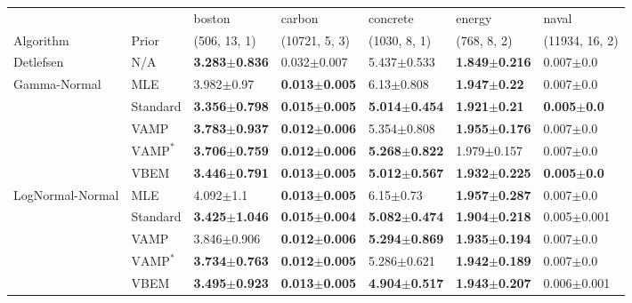 \begin{tabular}{lllllll}
\toprule
                 &      &                    boston &                    carbon &                  concrete &                    energy &                   naval \\
Algorithm & Prior& (506, 13, 1)& (10721, 5, 3)& (1030, 8, 1)& (768, 8, 2)& (11934, 16, 2)\\
\midrule
Detlefsen & N/A &  \textbf{3.283$\pm$0.836} &           0.032$\pm$0.007 &           5.437$\pm$0.533 &  \textbf{1.849$\pm$0.216} &           0.007$\pm$0.0 \\
Gamma-Normal & MLE &            3.982$\pm$0.97 &  \textbf{0.013$\pm$0.005} &            6.13$\pm$0.808 &   \textbf{1.947$\pm$0.22} &           0.007$\pm$0.0 \\
                 & Standard &  \textbf{3.356$\pm$0.798} &  \textbf{0.015$\pm$0.005} &  \textbf{5.014$\pm$0.454} &   \textbf{1.921$\pm$0.21} &  \textbf{0.005$\pm$0.0} \\
                 & VAMP &  \textbf{3.783$\pm$0.937} &  \textbf{0.012$\pm$0.006} &           5.354$\pm$0.808 &  \textbf{1.955$\pm$0.176} &           0.007$\pm$0.0 \\
                 & $\text{VAMP}^*$ &  \textbf{3.706$\pm$0.759} &  \textbf{0.012$\pm$0.006} &  \textbf{5.268$\pm$0.822} &           1.979$\pm$0.157 &           0.007$\pm$0.0 \\
                 & VBEM &  \textbf{3.446$\pm$0.791} &  \textbf{0.013$\pm$0.005} &  \textbf{5.012$\pm$0.567} &  \textbf{1.932$\pm$0.225} &  \textbf{0.005$\pm$0.0} \\
LogNormal-Normal & MLE &             4.092$\pm$1.1 &  \textbf{0.013$\pm$0.005} &             6.15$\pm$0.73 &  \textbf{1.957$\pm$0.287} &           0.007$\pm$0.0 \\
                 & Standard &  \textbf{3.425$\pm$1.046} &  \textbf{0.015$\pm$0.004} &  \textbf{5.082$\pm$0.474} &  \textbf{1.904$\pm$0.218} &         0.005$\pm$0.001 \\
                 & VAMP &           3.846$\pm$0.906 &  \textbf{0.012$\pm$0.006} &  \textbf{5.294$\pm$0.869} &  \textbf{1.935$\pm$0.194} &           0.007$\pm$0.0 \\
                 & $\text{VAMP}^*$ &  \textbf{3.734$\pm$0.763} &  \textbf{0.012$\pm$0.005} &           5.286$\pm$0.621 &  \textbf{1.942$\pm$0.189} &           0.007$\pm$0.0 \\
                 & VBEM &  \textbf{3.495$\pm$0.923} &  \textbf{0.013$\pm$0.005} &  \textbf{4.904$\pm$0.517} &  \textbf{1.943$\pm$0.207} &         0.006$\pm$0.001 \\

\end{tabular}
